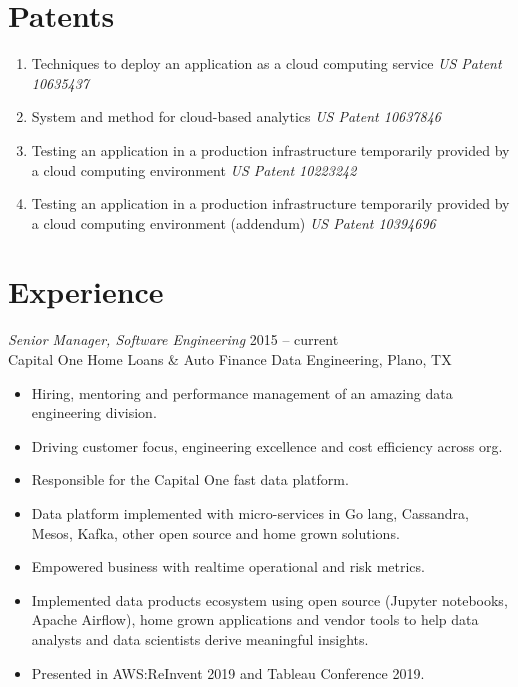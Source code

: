 \documentclass[margin]{res}
\begin{document}
\begin{resume}
    \section{Patents}
    \begin{enumerate}[leftmargin=0.5cm] \itemsep -2pt %
        \item Techniques to deploy an application as a cloud computing service {\sl US Patent 10635437}
        \item System and method for cloud-based analytics {\sl US Patent 10637846}
        \item Testing an application in a production infrastructure temporarily provided by a cloud computing environment {\sl US Patent 10223242}
        \item Testing an application in a production infrastructure temporarily provided by a cloud computing environment (addendum) {\sl US Patent 10394696}
    \end{enumerate}


    \section{Experience} {\sl Senior Manager, Software Engineering } \hfill 2015 -- current \\
    Capital One Home Loans \& Auto Finance Data Engineering, Plano, TX
    \begin{itemize} \itemsep -2pt %
        \item Hiring, mentoring and performance management of an amazing data engineering division.
        \item Driving customer focus, engineering excellence and cost efficiency across org.
        \item Responsible for the Capital One fast data platform.
        \item Data platform implemented with micro-services in Go lang, Cassandra, Mesos, Kafka, other open source and home grown solutions.
        \item Empowered business with realtime operational and risk metrics.
        \item Implemented data products ecosystem using open source (Jupyter notebooks, Apache Airflow), home grown applications and vendor tools to help data analysts and data scientists derive meaningful insights.
        \item Presented in AWS:ReInvent 2019 and Tableau Conference 2019.
    \end{itemize}


\end{resume}
\end{document}
